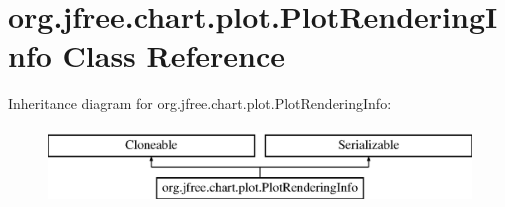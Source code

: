 \hypertarget{classorg_1_1jfree_1_1chart_1_1plot_1_1_plot_rendering_info}{}\section{org.\+jfree.\+chart.\+plot.\+Plot\+Rendering\+Info Class Reference}
\label{classorg_1_1jfree_1_1chart_1_1plot_1_1_plot_rendering_info}
Inheritance diagram for org.\+jfree.\+chart.\+plot.\+Plot\+Rendering\+Info\+:\begin{figure}[H]
\begin{center}
\leavevmode
\includegraphics[height=2.000000cm]{classorg_1_1jfree_1_1chart_1_1plot_1_1_plot_rendering_info}
\end{center}
\end{figure}
